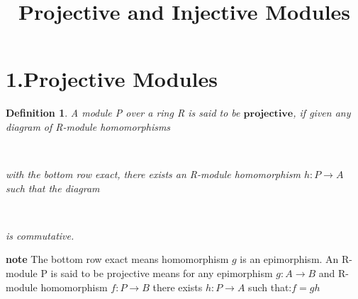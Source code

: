 \documentclass[a4paper]{article}
\title{Projective and Injective Modules}
\newtheorem{myDef}{Definition}
\begin{document}
    \maketitle
    \section*{1.Projective Modules}
    \begin{myDef}
        A module P over a ring R is said to be $\textbf{projective}$, if given any diagram of R-module 
        homomorphisms\\
        \begin{center}
            \\
        \end{center}
        with the bottom row exact, there exists an R-module homomorphism $h:P\rightarrow A$ such that the 
        diagram\\
        \begin{center}
            \\
        \end{center}
        is commutative.
    \end{myDef}
    \noindent
    \textbf{note} The bottom row exact means homomorphism $g$ is an epimorphism. An R-module P is said to be projective
     means for any epimorphism $g:A\rightarrow B$ and R-module homomorphism $f:P\rightarrow B$ there exists $h:P\rightarrow A$
     such that:$f=gh$
\end{document}
